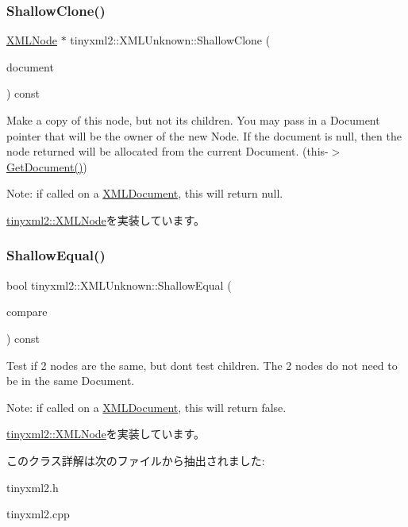 \subsubsection{\texorpdfstring{Shallow\+Clone()}{ShallowClone()}}
{\footnotesize\ttfamily \hyperlink{classtinyxml2_1_1_x_m_l_node}{X\+M\+L\+Node} $\ast$ tinyxml2\+::\+X\+M\+L\+Unknown\+::\+Shallow\+Clone (\begin{DoxyParamCaption}\item[{\hyperlink{classtinyxml2_1_1_x_m_l_document}{X\+M\+L\+Document} $\ast$}]{document }\end{DoxyParamCaption}) const\hspace{0.3cm}{\ttfamily [virtual]}}

Make a copy of this node, but not its children. You may pass in a Document pointer that will be the owner of the new Node. If the \textquotesingle{}document\textquotesingle{} is null, then the node returned will be allocated from the current Document. (this-\/$>$\hyperlink{classtinyxml2_1_1_x_m_l_node_af343d1ef0b45c0020e62d784d7e67a68}{Get\+Document()})

Note\+: if called on a \hyperlink{classtinyxml2_1_1_x_m_l_document}{X\+M\+L\+Document}, this will return null. 

\hyperlink{classtinyxml2_1_1_x_m_l_node_a8402cbd3129d20e9e6024bbcc0531283}{tinyxml2\+::\+X\+M\+L\+Node}を実装しています。

\mbox{\label{classtinyxml2_1_1_x_m_l_unknown_ac46767cd721d666e690a6231dfb618d1}} 
\subsubsection{\texorpdfstring{Shallow\+Equal()}{ShallowEqual()}}
{\footnotesize\ttfamily bool tinyxml2\+::\+X\+M\+L\+Unknown\+::\+Shallow\+Equal (\begin{DoxyParamCaption}\item[{const \hyperlink{classtinyxml2_1_1_x_m_l_node}{X\+M\+L\+Node} $\ast$}]{compare }\end{DoxyParamCaption}) const\hspace{0.3cm}{\ttfamily [virtual]}}

Test if 2 nodes are the same, but don\textquotesingle{}t test children. The 2 nodes do not need to be in the same Document.

Note\+: if called on a \hyperlink{classtinyxml2_1_1_x_m_l_document}{X\+M\+L\+Document}, this will return false. 

\hyperlink{classtinyxml2_1_1_x_m_l_node_a7ce18b751c3ea09eac292dca264f9226}{tinyxml2\+::\+X\+M\+L\+Node}を実装しています。



このクラス詳解は次のファイルから抽出されました\+:\begin{DoxyCompactItemize}
\item 
tinyxml2.\+h\item 
tinyxml2.\+cpp\end{DoxyCompactItemize}
